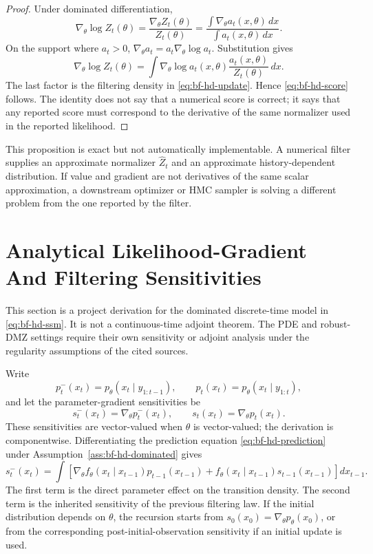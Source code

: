 \begin{proof}
Under dominated differentiation,
\[
  \nabla_\theta\log Z_t(\theta)
  =\frac{\nabla_\theta Z_t(\theta)}{Z_t(\theta)}
  =
  \frac{\int \nabla_\theta a_t(x,\theta)\,dx}
       {\int a_t(x,\theta)\,dx}.
\]
On the support where \(a_t>0\),
\(\nabla_\theta a_t=a_t\nabla_\theta\log a_t\).  Substitution gives
\[
  \nabla_\theta\log Z_t(\theta)
  =
  \int \nabla_\theta\log a_t(x,\theta)
       \frac{a_t(x,\theta)}{Z_t(\theta)}\,dx .
\]
The last factor is the filtering density in
\eqref{eq:bf-hd-update}.  Hence \eqref{eq:bf-hd-score} follows.  The identity
does not say that a numerical score is correct; it says that any reported score
must correspond to the derivative of the same normalizer used in the reported
likelihood.
\end{proof}

This proposition is exact but not automatically implementable.  A numerical
filter supplies an approximate normalizer $\widehat Z_t$ and an approximate
history-dependent distribution.  If value and gradient are not derivatives of
the same scalar approximation, a downstream optimizer or HMC sampler is solving
a different problem from the one reported by the filter.

\section{Analytical Likelihood-Gradient And Filtering Sensitivities}
\label{sec:bf-hd-analytical-likelihood-gradient}

This section is a project derivation for the dominated discrete-time model in
\eqref{eq:bf-hd-ssm}.  It is not a continuous-time adjoint theorem.  The PDE
and robust-DMZ settings require their own sensitivity or adjoint analysis under
the regularity assumptions of the cited sources.

Write
\[
  p_t^-(x_t)=p_\theta(x_t\mid y_{1:t-1}),\qquad
  p_t(x_t)=p_\theta(x_t\mid y_{1:t}),
\]
and let the parameter-gradient sensitivities be
\[
  s_t^-(x_t)=\nabla_\theta p_t^-(x_t),\qquad
  s_t(x_t)=\nabla_\theta p_t(x_t).
\]
These sensitivities are vector-valued when \(\theta\) is vector-valued; the
derivation is componentwise.  Differentiating the prediction equation
\eqref{eq:bf-hd-prediction} under Assumption~\ref{ass:bf-hd-dominated} gives
\begin{equation}
  s^-_t(x_t)
  =
  \int
  \left[
  \nabla_\theta f_\theta(x_t\mid x_{t-1})
  p_{t-1}(x_{t-1})
  +
  f_\theta(x_t\mid x_{t-1})
  s_{t-1}(x_{t-1})
  \right]dx_{t-1}.
  \label{eq:bf-hd-prediction-sensitivity}
\end{equation}
The first term is the direct parameter effect on the transition density.  The
second term is the inherited sensitivity of the previous filtering law.  If
the initial distribution depends on \(\theta\), the recursion starts from
\(s_0(x_0)=\nabla_\theta p_\theta(x_0)\), or from the corresponding
post-initial-observation sensitivity if an initial update is used.

